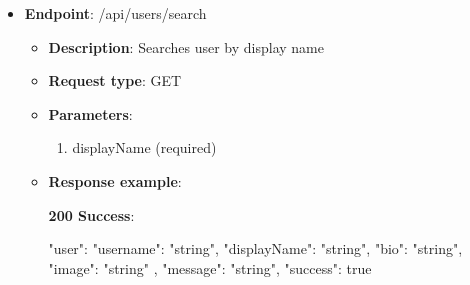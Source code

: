 \begin{itemize}
\begin{itemize}
        \textbf{200 Success}:

        \begin{spverbatim}
        {
            "user": {
            "username": "string",
            "displayName": "string",
            "bio": "string",
            "image": "string"
        },
            "message": "string",
            "success": true
        }
        \end{spverbatim}

        \textbf{400 Bad Request}:

        \begin{spverbatim}
        {
            "errorMessage": "string",
            "errorDetails": "string",
            "statusCode": 0,
            "success": true
        }
        \end{spverbatim}

        \textbf{409 Conflict}:

        \begin{spverbatim}
        {
            "errorMessage": "string",
            "errorDetails": "string",
            "statusCode": 0,
            "success": true
        }
        \end{spverbatim}

        \item \textbf{Response messages}:
        \begin{enumerate}
            \item Success.
            \item User not found.
        \end{enumerate}
    \end{itemize}
    \item \textbf{Endpoint}: /api/users/search
    \begin{itemize}
        \item \textbf{Description}: Searches user by display name
        \item \textbf{Request type}: GET
        \item \textbf{Parameters}:
        \begin{enumerate}
            \item displayName (required)
        \end{enumerate}
        \item \textbf{Response example}:

        \textbf{200 Success}:

        \begin{spverbatim}
        {
            "user": {
            "username": "string",
            "displayName": "string",
            "bio": "string",
            "image": "string"
        },
            "message": "string",
            "success": true
        }
        \end{spverbatim}


\end{itemize}
\end{itemize}

